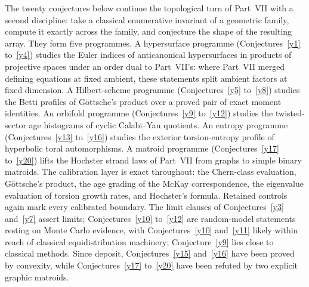 \documentclass[11pt]{article}
\theoremstyle{definition}
\begin{document}
The twenty conjectures below continue the topological turn of Part~VII with a second discipline: take a classical enumerative invariant of a geometric family, compute it exactly across the family, and conjecture the shape of the resulting array.  They form five programmes.  A hypersurface programme (Conjectures~\ref{y1} to~\ref{y4}) studies the Euler indices of anticanonical hypersurfaces in products of projective spaces under an order dual to Part~VII's: where Part~VII merged defining equations at fixed ambient, these statements split ambient factors at fixed dimension.  A Hilbert-scheme programme (Conjectures~\ref{y5} to~\ref{y8}) studies the Betti profiles of G\"ottsche's product over a proved pair of exact moment identities.  An orbifold programme (Conjectures~\ref{y9} to~\ref{y12}) studies the twisted-sector age histograms of cyclic Calabi--Yau quotients.  An entropy programme (Conjectures~\ref{y13} to~\ref{y16}) studies the exterior torsion-entropy profile of hyperbolic toral automorphisms.  A matroid programme (Conjectures~\ref{y17} to~\ref{y20}) lifts the Hochster strand laws of Part~VII from graphs to simple binary matroids.  The calibration layer is exact throughout: the Chern-class evaluation, G\"ottsche's product, the age grading of the McKay correspondence, the eigenvalue evaluation of torsion growth rates, and Hochster's formula.  Retained controls again mark every calibrated boundary.  The limit clauses of Conjectures~\ref{y3} and~\ref{y7} assert limits; Conjectures~\ref{y10} to~\ref{y12} are random-model statements resting on Monte Carlo evidence, with Conjectures~\ref{y10} and~\ref{y11} likely within reach of classical equidistribution machinery; Conjecture~\ref{y9} lies close to classical methods.  Since deposit, Conjectures~\ref{y15} and~\ref{y16} have been proved by convexity, while Conjectures~\ref{y17} to~\ref{y20} have been refuted by two explicit graphic matroids.
\end{document}
